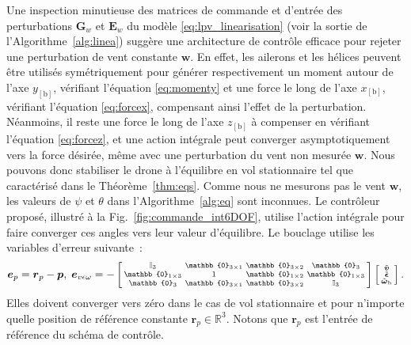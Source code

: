Une inspection minutieuse des matrices de commande et d'entrée des perturbations $\boldsymbol{G}_{w}$ et $\boldsymbol{E}_{w}$ du modèle \eqref{eq:lpv_linearisation} (voir la sortie de l'Algorithme~\ref{alg:linea}) suggère une architecture de contrôle efficace pour rejeter une perturbation de vent constante $\boldsymbol{w}$. En effet, les ailerons et les hélices peuvent être utilisés symétriquement pour générer respectivement un moment autour de l'axe $y_{[\text{b}]}$, vérifiant l'équation \eqref{eq:momenty} et une force le long de l'axe $x_{[\text{b}]}$, vérifiant l'équation \eqref{eq:forcex}, compensant ainsi l'effet de la perturbation. Néanmoins, il reste une force le long de l'axe $z_{[\text{b}]}$ à compenser en vérifiant l'équation \eqref{eq:forcez}, et une action intégrale peut converger asymptotiquement vers la force désirée, même avec une perturbation du vent non mesurée $\boldsymbol{w}$. Nous pouvons donc stabiliser le drone à l'équilibre en vol stationnaire tel que caractérisé dans le Théorème~\ref{thm:eqs}. Comme nous ne mesurons pas le vent $\boldsymbol{w}$, les valeurs de $\psi$ et $\theta$ dans l'Algorithme~\ref{alg:eq} sont inconnues. Le contrôleur proposé, illustré à la Fig.~\ref{fig:commande_int6DOF}, utilise l'action intégrale pour faire converger ces angles vers leur valeur d'équilibre. Le bouclage utilise les variables d'erreur suivante : 
\begin{align}
    \boldsymbol{e}_{p}= \boldsymbol{r}_{p} - \boldsymbol{p}, \; \boldsymbol{e}_{v \epsilon \omega} = -  
       \left[ \begin{smallmatrix} \mathbb{I}_{3}  & \mathbb{0}_{3\times 1} & \mathbb{0}_{3\times 2} & \mathbb{0}_{3}\\
       \mathbb{0}_{1\times 3}  & 1 & \mathbb{0}_{1\times 2} & \mathbb{0}_{1 \times 3} \\
           \mathbb{0}_{3}  & \mathbb{0}_{3\times 1} & \mathbb{0}_{3\times 2} &   \mathbb{I}_{3}
           \end{smallmatrix} \right]
    \smallmat{
           \tilde{\boldsymbol{v}} \\
           \tilde{\boldsymbol{\epsilon}} \\
           \tilde{\boldsymbol{\omega}}_{\text{b}} 
    }.
  \label{eq:error_var}
  \end{align} 
Elles doivent converger vers zéro dans le cas de vol stationnaire et pour n'importe quelle position de référence constante $\boldsymbol{r}_{p} \in \mathbb{R}^{3}$. Notons que $\boldsymbol{r}_{p}$ est l'entrée de référence du schéma de contrôle.

